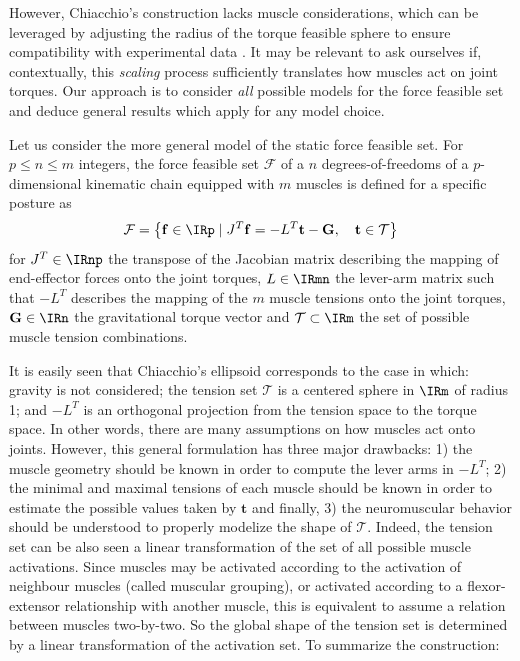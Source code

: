 However, Chiacchio's construction lacks muscle considerations, which can be leveraged by adjusting the radius of the torque feasible sphere to ensure compatibility with experimental data \cite{rezzougUpperLimbIsometricForce2021b}. It may be relevant to ask ourselves if, contextually, this \emph{scaling} process sufficiently translates how muscles act on joint torques. Our approach is to consider \emph{all} possible models for the force feasible set and deduce general results which apply for any model choice. 

Let us consider the more general model of the static force feasible set. For $p \leq n \leq m$ integers, the force feasible set $\mathcal{F}$ of a $n$ degrees-of-freedoms of a $p$-dimensional kinematic chain equipped with $m$ muscles is defined for a specific posture as 
$$\mathcal{F} = \left\{ \mathbf{f}\in\IRp \mid J^T\mathbf{f} = -L^T\mathbf{t} - \mathbf{G},\quad \mathbf{t}\in\mathcal{T}\right\}$$
for $J^T\in\IRnp$ the transpose of the Jacobian matrix describing the mapping of end-effector forces onto the joint torques, $L\in\IRmn$ the lever-arm matrix such that $-L^T$ describes the mapping of the $m$ muscle tensions onto the joint torques, $\mathbf{G}\in\IRn$ the gravitational torque vector and $\mathcal{T}\subset \IRm$ the set of possible muscle tension combinations.

It is easily seen that Chiacchio's ellipsoid corresponds to the case in which: gravity is not considered; the tension set $\mathcal{T}$ is a centered sphere in $\IRm$ of radius 1; and $-L^T$ is an orthogonal projection from the tension space to the torque space. In other words, there are many assumptions on how muscles act onto joints. However, this general formulation has three major drawbacks: 1) the muscle geometry should be known in order to compute the lever arms in  $-L^T$; 2) the minimal and maximal tensions of each muscle should be known in order to estimate the possible values taken by $\mathbf{t}$ and finally, 3) the neuromuscular behavior should be understood to properly modelize the shape of $\mathcal{T}$. Indeed, the tension set can be also seen a linear transformation of the set of all possible muscle activations. Since muscles may be activated according to the activation of neighbour muscles (called muscular grouping), or activated according to a flexor-extensor relationship with another muscle, this is equivalent to assume a relation between muscles two-by-two. So the global shape of the tension set is determined by a linear transformation of the activation set. To summarize the construction:

